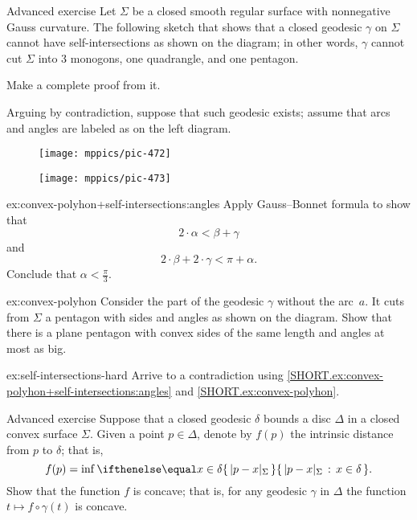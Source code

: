 \begin{thm}{Advanced exercise}\label{ex:convex-polyhon+self-intersections}
Let $\Sigma$ be a closed smooth regular surface with nonnegative Gauss curvature.
The following sketch that shows that a closed geodesic $\gamma$ on $\Sigma$ cannot have self-intersections as shown on the diagram;
in other words, $\gamma$ cannot cut $\Sigma$ into 3 monogons, one quadrangle, and one pentagon. 

Make a complete proof from it.

Arguing by contradiction, suppose that such geodesic exists;
assume that arcs and angles are labeled as on the left diagram.

\begin{figure}[h!]
\begin{minipage}{.38\textwidth}
\centering
\texttt{[image: mppics/pic-472]}
\end{minipage}\hfill
\begin{minipage}{.58\textwidth}
\centering
\texttt{[image: mppics/pic-473]}
\end{minipage}
\end{figure}

\begin{subthm}{ex:convex-polyhon+self-intersections:angles}
Apply Gauss--Bonnet formula to show that
\[2\cdot\alpha<\beta+\gamma\]
and 
\[2\cdot\beta+2\cdot \gamma<\pi+\alpha.\]
Conclude that $\alpha <\tfrac \pi 3$.
\end{subthm}

\begin{subthm}{ex:convex-polyhon}
Consider the part of the geodesic $\gamma$ without the arc~$a$.
It cuts from $\Sigma$ a pentagon with sides and angles as shown on the diagram. 
Show that there is a plane pentagon with convex sides of the same length and angles at most as big.
\end{subthm}

\begin{subthm}{ex:self-intersections-hard}
Arrive to a contradiction using \ref{SHORT.ex:convex-polyhon+self-intersections:angles} and \ref{SHORT.ex:convex-polyhon}. 
\end{subthm}

\end{thm}



\begin{thm}{Advanced exercise}\label{ex:dist-to-bry}
Suppose that a closed geodesic $\delta$ bounds a disc $\Delta$ in a closed convex surface $\Sigma$.
Given a point $p\in\Delta$, denote by $f(p)$ the intrinsic distance from $p$ to $\delta$;
that is,
\[f(p)=\inf\set{|p-x|_\Sigma}{x\in\delta}.\]
Show that the function $f$ is concave;
that is, for any geodesic $\gamma$ in $\Delta$ the function $t\mapsto f\circ\gamma(t)$ is concave.
\end{thm}





